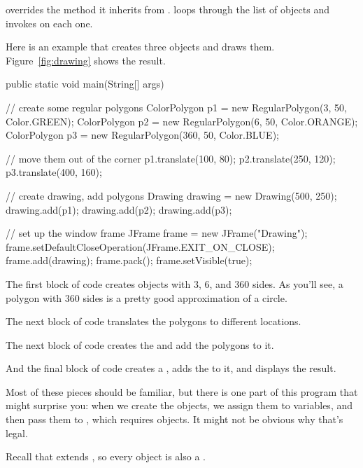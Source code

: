  overrides the  method it inherits from .
 loops through the list of  objects and invokes  on each one.

Here is an example that creates three  objects and draws them.
Figure~\ref{fig:drawing} shows the result.

\begin{code}
public static void main(String[] args) {

    // create some regular polygons
    ColorPolygon p1 = new RegularPolygon(3, 50, Color.GREEN);
    ColorPolygon p2 = new RegularPolygon(6, 50, Color.ORANGE);
    ColorPolygon p3 = new RegularPolygon(360, 50, Color.BLUE);

    // move them out of the corner
    p1.translate(100, 80);
    p2.translate(250, 120);
    p3.translate(400, 160);

    // create drawing, add polygons
    Drawing drawing = new Drawing(500, 250);
    drawing.add(p1);
    drawing.add(p2);
    drawing.add(p3);

    // set up the window frame
    JFrame frame = new JFrame("Drawing");
    frame.setDefaultCloseOperation(JFrame.EXIT_ON_CLOSE);
    frame.add(drawing);
    frame.pack();
    frame.setVisible(true);
}
\end{code}

The first block of code creates  objects with 3, 6, and 360 sides.
As you'll see, a polygon with 360 sides is a pretty good approximation of a circle.

The next block of code translates the polygons to different locations.

The next block of code creates the  and add the polygons to it.

And the final block of code creates a , adds the  to it, and displays the result.

Most of these pieces should be familiar, but there is one part of this program that might surprise you: when we create the  objects, we assign them to  variables, and then pass them to , which requires  objects.
It might not be obvious why that's legal.


Recall that  extends , so every  object is also a .

